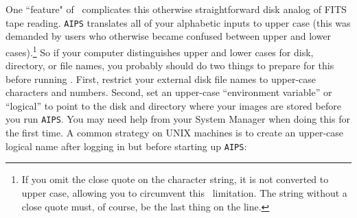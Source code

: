         One ``feature" of \AIPS\ complicates this otherwise
straightforward disk analog of FITS tape reading.  {\tt AIPS}
translates all of your alphabetic inputs to upper case (this was
demanded by users who otherwise became confused between upper and
lower cases).\footnote{If you omit the close quote on the character
string, it is not converted to upper case, allowing you to circumvent
this \AIPS\ limitation.  The string without a close quote must, of
course, be the last thing on the line.}  So if your computer
distinguishes upper and lower cases for disk, directory, or file
names, you probably should do two things to prepare for this before
running \AIPS\@.  First, restrict your external disk file names
to upper-case characters and numbers.  Second, set an upper-case
``environment variable'' or ``logical'' to point to the disk and
directory where your  images are stored before you run
{\tt AIPS}\@.  You may need help from your System Manager when doing
this for the first time.  A common strategy on UNIX machines is to
create an upper-case logical name after logging in but before starting
up {\tt AIPS}:

